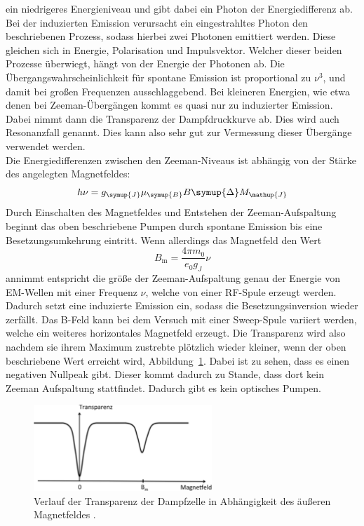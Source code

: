 \documentclass[
  bibliography=totoc,     %
  captions=tableheading,  %
  titlepage=firstiscover, %
]{scrartcl}
\begin{document}
ein niedrigeres Energieniveau und gibt dabei ein Photon der Energiedifferenz
ab. Bei der induzierten Emission verursacht ein eingestrahltes Photon
den beschriebenen Prozess, sodass hierbei zwei Photonen emittiert werden. Diese
gleichen sich in Energie, Polarisation und Impulsvektor. Welcher dieser beiden
Prozesse überwiegt, hängt von der Energie der Photonen ab. Die
Übergangswahrscheinlichkeit für spontane Emission ist proportional zu $\nu^3$,
und damit bei großen Frequenzen ausschlaggebend. Bei kleineren Energien, wie
etwa denen bei Zeeman-Übergängen kommt es quasi nur zu induzierter Emission.
Dabei nimmt dann die Transparenz der Dampfdruckkurve ab. Dies wird auch Resonanzfall
genannt.
Dies kann also sehr gut zur Vermessung dieser Übergänge verwendet werden. \\
Die Energiedifferenzen zwischen den Zeeman-Niveaus ist abhängig von der Stärke
des angelegten Magnetfeldes:
%
\begin{equation}
  h\nu=g_{\symup{J}}\mu_{\symup{B}}B\symup{\Delta}M_{\mathup{J}}
  \label{eq:übergangsenergie}
\end{equation}
%
Durch Einschalten des Magnetfeldes und Entstehen der Zeeman-Aufspaltung beginnt
das oben beschriebene Pumpen durch spontane Emission bis eine
Besetzungsumkehrung eintritt. Wenn allerdings das Magnetfeld den Wert
%
\begin{equation}
  B_{\mathup{m}}=\frac{4\pi m_0}{e_0g_J}\nu
\end{equation}
%
annimmt entspricht die größe der Zeeman-Aufspaltung genau der Energie von
EM-Wellen mit einer Frequenz $\nu$, welche von einer RF-Spule erzeugt werden.
Dadurch setzt eine induzierte Emission ein, sodass die Besetzungsinversion wieder
zerfällt. Das B-Feld kann bei dem Versuch mit einer Sweep-Spule variiert werden,
welche ein weiteres horizontales Magnetfeld erzeugt. Die Transparenz wird also
nachdem sie ihrem Maximum zustrebte plötzlich wieder kleiner, wenn der oben
beschriebene Wert erreicht wird, Abbildung~\ref{fig:transparenz_b}.
Dabei ist zu sehen, dass es einen negativen Nullpeak gibt. Dieser kommt dadurch
zu Stande, dass dort kein Zeeman Aufspaltung stattfindet. Dadurch gibt es kein
optisches Pumpen.
\begin{figure}[htb]
  \centering
  \includegraphics[width=0.6\textwidth]{transparenzkurve.pdf}
  \caption{Verlauf der Transparenz der Dampfzelle in Abhängigkeit des äußeren Magnetfeldes \cite{anleitung}.}
  \label{fig:transparenz_b}
\end{figure}
%
\end{document}
